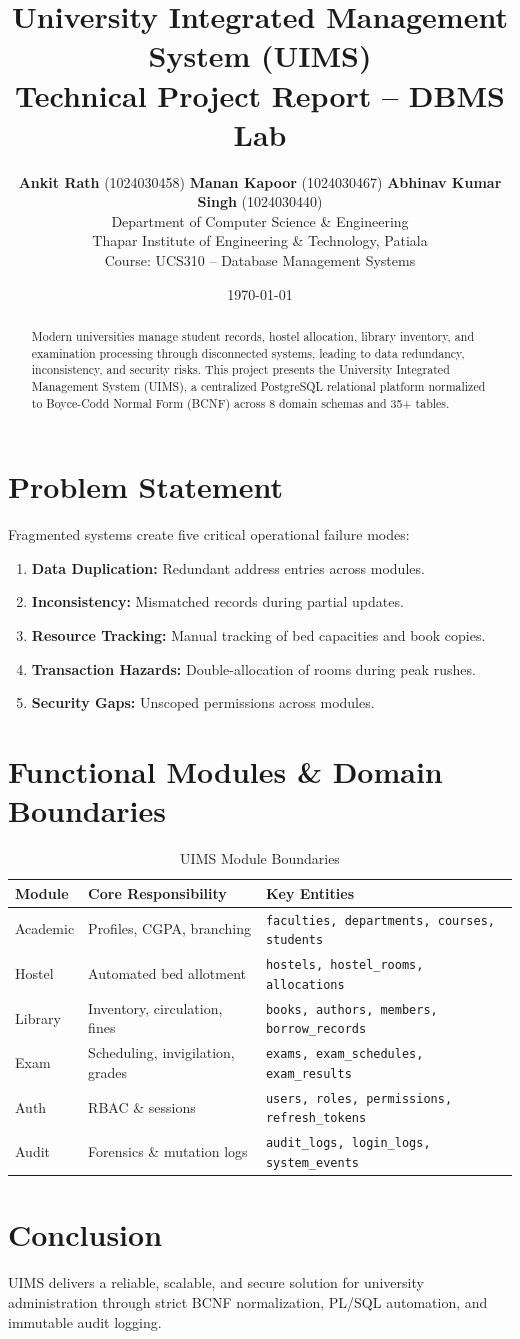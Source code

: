 \documentclass[11pt,a4paper]{article}
\title{\textbf{University Integrated Management System (UIMS)}\\ \Large Technical Project Report -- DBMS Lab}
\author{\textbf{Ankit Rath} (1024030458) \quad \textbf{Manan Kapoor} (1024030467) \quad \textbf{Abhinav Kumar Singh} (1024030440)\\
\small Department of Computer Science \& Engineering\\
\small Thapar Institute of Engineering \& Technology, Patiala\\
\small Course: UCS310 -- Database Management Systems}
\date{\today}
\begin{document}
\maketitle

\begin{abstract}
Modern universities manage student records, hostel allocation, library inventory, and examination processing through disconnected systems, leading to data redundancy, inconsistency, and security risks. This project presents the University Integrated Management System (UIMS), a centralized PostgreSQL relational platform normalized to Boyce-Codd Normal Form (BCNF) across 8 domain schemas and 35+ tables.
\end{abstract}

\section{Problem Statement}
Fragmented systems create five critical operational failure modes:
\begin{enumerate}
    \item \textbf{Data Duplication:} Redundant address entries across modules.
    \item \textbf{Inconsistency:} Mismatched records during partial updates.
    \item \textbf{Resource Tracking:} Manual tracking of bed capacities and book copies.
    \item \textbf{Transaction Hazards:} Double-allocation of rooms during peak rushes.
    \item \textbf{Security Gaps:} Unscoped permissions across modules.
\end{enumerate}

\section{Functional Modules \& Domain Boundaries}
\begin{table}[h!]
\centering
\begin{tabular}{lll}
\toprule
\textbf{Module} & \textbf{Core Responsibility} & \textbf{Key Entities} \\
\midrule
Academic & Profiles, CGPA, branching & \texttt{faculties, departments, courses, students} \\
Hostel & Automated bed allotment & \texttt{hostels, hostel\_rooms, allocations} \\
Library & Inventory, circulation, fines & \texttt{books, authors, members, borrow\_records} \\
Exam & Scheduling, invigilation, grades & \texttt{exams, exam\_schedules, exam\_results} \\
Auth & RBAC \& sessions & \texttt{users, roles, permissions, refresh\_tokens} \\
Audit & Forensics \& mutation logs & \texttt{audit\_logs, login\_logs, system\_events} \\
\bottomrule
\end{tabular}
\caption{UIMS Module Boundaries}
\end{table}

\section{Conclusion}
UIMS delivers a reliable, scalable, and secure solution for university administration through strict BCNF normalization, PL/SQL automation, and immutable audit logging.
\end{document}
